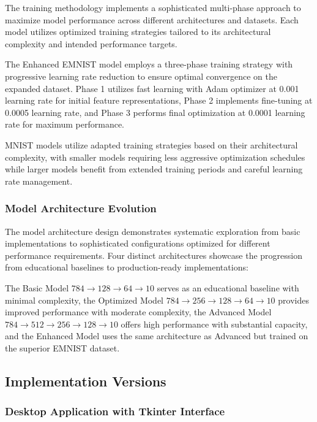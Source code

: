 \documentclass[11pt,a4paper]{report}
\begin{document}
The training methodology implements a sophisticated multi-phase approach to maximize model performance across different architectures and datasets. Each model utilizes optimized training strategies tailored to its architectural complexity and intended performance targets.

The Enhanced EMNIST model employs a three-phase training strategy with progressive learning rate reduction to ensure optimal convergence on the expanded dataset. Phase 1 utilizes fast learning with Adam optimizer at 0.001 learning rate for initial feature representations, Phase 2 implements fine-tuning at 0.0005 learning rate, and Phase 3 performs final optimization at 0.0001 learning rate for maximum performance.

MNIST models utilize adapted training strategies based on their architectural complexity, with smaller models requiring less aggressive optimization schedules while larger models benefit from extended training periods and careful learning rate management.

\subsubsection{Model Architecture Evolution}

The model architecture design demonstrates systematic exploration from basic implementations to sophisticated configurations optimized for different performance requirements. Four distinct architectures showcase the progression from educational baselines to production-ready implementations:

The Basic Model $784 \rightarrow 128 \rightarrow 64 \rightarrow 10$ serves as an educational baseline with minimal complexity, the Optimized Model $784 \rightarrow 256 \rightarrow 128 \rightarrow 64 \rightarrow 10$ provides improved performance with moderate complexity, the Advanced Model $784 \rightarrow 512 \rightarrow 256 \rightarrow 128 \rightarrow 10$ offers high performance with substantial capacity, and the Enhanced Model uses the same architecture as Advanced but trained on the superior EMNIST dataset.

\subsection{Implementation Versions}

\subsubsection{Desktop Application with Tkinter Interface}
\end{document}
